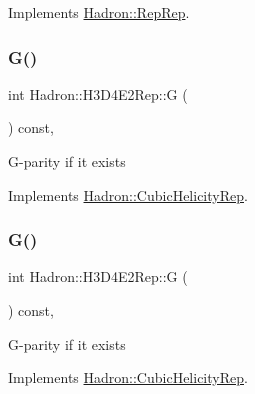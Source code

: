 Implements \mbox{\hyperlink{structHadron_1_1RepRep_a92c8802e5ed7afd7da43ccfd5b7cd92b}{Hadron\+::\+Rep\+Rep}}.

\mbox{\label{structHadron_1_1H3D4E2Rep_a90b501cdfc244c792b2fac27a1470b78}} 
\subsubsection{\texorpdfstring{G()}{G()}\hspace{0.1cm}{\footnotesize\ttfamily [1/3]}}
{\footnotesize\ttfamily int Hadron\+::\+H3\+D4\+E2\+Rep\+::G (\begin{DoxyParamCaption}{ }\end{DoxyParamCaption}) const\hspace{0.3cm}{\ttfamily [inline]}, {\ttfamily [virtual]}}

G-\/parity if it exists 

Implements \mbox{\hyperlink{structHadron_1_1CubicHelicityRep_a50689f42be1e6170aa8cf6ad0597018b}{Hadron\+::\+Cubic\+Helicity\+Rep}}.

\mbox{\label{structHadron_1_1H3D4E2Rep_a90b501cdfc244c792b2fac27a1470b78}} 
\subsubsection{\texorpdfstring{G()}{G()}\hspace{0.1cm}{\footnotesize\ttfamily [2/3]}}
{\footnotesize\ttfamily int Hadron\+::\+H3\+D4\+E2\+Rep\+::G (\begin{DoxyParamCaption}{ }\end{DoxyParamCaption}) const\hspace{0.3cm}{\ttfamily [inline]}, {\ttfamily [virtual]}}

G-\/parity if it exists 

Implements \mbox{\hyperlink{structHadron_1_1CubicHelicityRep_a50689f42be1e6170aa8cf6ad0597018b}{Hadron\+::\+Cubic\+Helicity\+Rep}}.

\mbox{\label{structHadron_1_1H3D4E2Rep_a90b501cdfc244c792b2fac27a1470b78}} 
